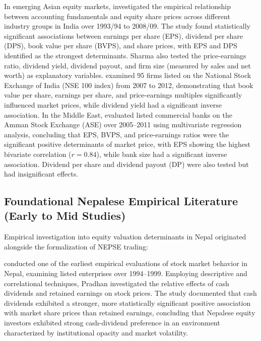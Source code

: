 In emerging Asian equity markets, \citet{sharma2011} investigated the empirical relationship between accounting fundamentals and equity share prices across different industry groups in India over 1993/94 to 2008/09. The study found statistically significant associations between earnings per share (EPS), dividend per share (DPS), book value per share (BVPS), and share prices, with EPS and DPS identified as the strongest determinants. Sharma also tested the price-earnings ratio, dividend yield, dividend payout, and firm size (measured by sales and net worth) as explanatory variables. \citet{malhotra2013} examined 95 firms listed on the National Stock Exchange of India (NSE 100 index) from 2007 to 2012, demonstrating that book value per share, earnings per share, and price-earnings multiples significantly influenced market prices, while dividend yield had a significant inverse association. In the Middle East, \citet{almumani2014} evaluated listed commercial banks on the Amman Stock Exchange (ASE) over 2005--2011 using multivariate regression analysis, concluding that EPS, BVPS, and price-earnings ratios were the significant positive determinants of market price, with EPS showing the highest bivariate correlation ($r = 0.84$), while bank size had a significant inverse association. Dividend per share and dividend payout (DP) were also tested but had insignificant effects.

\subsection{Foundational Nepalese Empirical Literature (Early to Mid Studies)}
\label{subsec:foundational_nepal}

Empirical investigation into equity valuation determinants in Nepal originated alongside the formalization of NEPSE trading:

\citet{pradhan2003} conducted one of the earliest empirical evaluations of stock market behavior in Nepal, examining listed enterprises over 1994--1999. Employing descriptive and correlational techniques, Pradhan investigated the relative effects of cash dividends and retained earnings on stock prices. The study documented that cash dividends exhibited a stronger, more statistically significant positive association with market share prices than retained earnings, concluding that Nepalese equity investors exhibited strong cash-dividend preference in an environment characterized by institutional opacity and market volatility.


